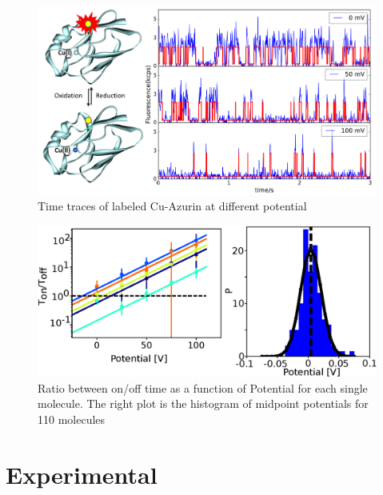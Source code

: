 \documentclass[journal=jpclcd,manuscript=article]{achemso}
\begin{document}
\begin{figure}
	\includegraphics[width=\textwidth]{Figure/Figure_1_timetrace_CuAzu.svg}
	\caption{Time traces of labeled Cu-Azurin at different 		 		potential}
	\label{fig:timetrace}
\end{figure}

\begin{figure}
	\includegraphics[width=\textwidth]{Figure/Figure_3_midpoint.eps}
	\caption{Ratio between on/off time as a function of Potential 		for each single molecule. The right plot is the histogram of  	 	midpoint potentials for 110 molecules}
	\label{fig:midpoint}
\end{figure}


\section{Experimental}

\end{document}

